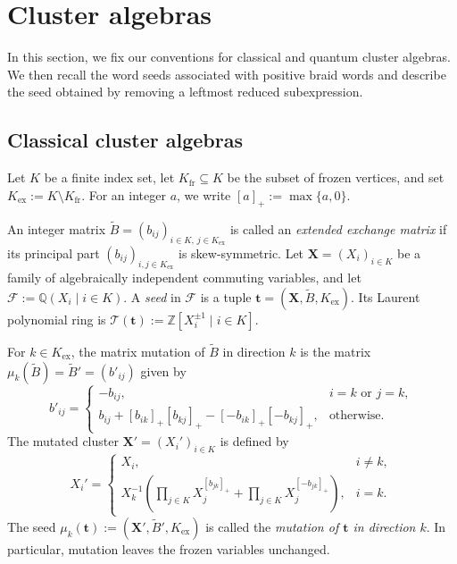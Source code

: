 \documentclass[12pt, reqno]{amsart}
\theoremstyle{plain}
\theoremstyle{definition}
\numberwithin{equation}{section}
\newcommand{\ZZ}{\mathbb{Z}}
\newcommand{\QQ}{\mathbb{Q}}
\begin{document}
\section{Cluster algebras}\label{sec:cluster}
In this section, we fix our conventions for classical and quantum cluster
algebras. We then recall the word seeds associated with positive braid words
and describe the seed obtained by removing a leftmost reduced subexpression.

\subsection{Classical cluster algebras}
Let \(K\) be a finite index set, let \(K_{\mathrm{fr}}\subseteq K\) be
the subset of frozen vertices, and set
\(K_{\mathrm{ex}}:=K\setminus K_{\mathrm{fr}}\). For an integer \(a\),
we write \([a]_+:=\max\{a,0\}\).

An integer matrix
\(\widetilde B=(b_{ij})_{i\in K,\,j\in K_{\mathrm{ex}}}\) is called an
\emph{extended exchange matrix} if its principal part
\((b_{ij})_{i,j\in K_{\mathrm{ex}}}\) is skew-symmetric. Let
\(\mathbf X=(X_i)_{i\in K}\) be a family of algebraically independent
commuting variables, and let \(\mathcal F:=\QQ(X_i\mid i\in K)\). A
\emph{seed} in \(\mathcal F\) is a tuple
\(\mathbf t=(\mathbf X,\widetilde B,K_{\mathrm{ex}})\). Its Laurent
polynomial ring is
\(\mathcal T(\mathbf t):=\ZZ[X_i^{\pm1}\mid i\in K]\).

For \(k\in K_{\mathrm{ex}}\), the matrix mutation of \(\widetilde B\) in
direction \(k\) is the matrix
\(\mu_k(\widetilde B)=\widetilde B'=(b'_{ij})\) given by
\begin{equation}\label{eq:matrix-mutation}
    b'_{ij}=
    \begin{cases}
        -b_{ij},
        & i=k \text{ or } j=k,\\
        b_{ij}+[b_{ik}]_+[b_{kj}]_+
        -[-b_{ik}]_+[-b_{kj}]_+,
        & \text{otherwise}.
    \end{cases}
\end{equation}
The mutated cluster \(\mathbf X'=(X_i')_{i\in K}\) is defined by
\begin{equation}\label{eq:cluster-mutation}
    X_i'=
    \begin{cases}
        X_i,
        & i\neq k,\\[1mm]
        \displaystyle
        X_k^{-1}\left(
            \prod_{j\in K}X_j^{[b_{jk}]_+}
            +\prod_{j\in K}X_j^{[-b_{jk}]_+}
        \right),
        & i=k.
    \end{cases}
\end{equation}
The seed
\(\mu_k(\mathbf t):=(\mathbf X',\widetilde B',K_{\mathrm{ex}})\) is
called the \emph{mutation of \(\mathbf t\) in direction \(k\)}. In
particular, mutation leaves the frozen variables unchanged.
\end{document}
